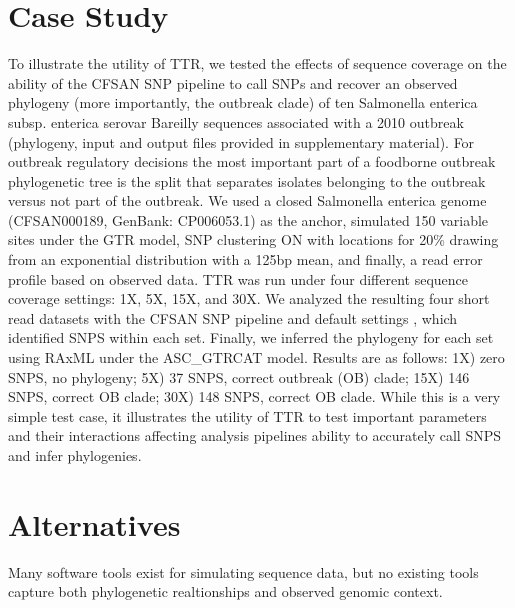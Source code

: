 \section{Case Study}
To illustrate the utility of TTR, we tested the effects of sequence coverage on the ability of the CFSAN SNP pipeline \citep{davis_cfsan_2015} 
to call SNPs and recover an observed phylogeny (more importantly, the outbreak clade) of ten Salmonella enterica subsp. enterica serovar Bareilly sequences 
associated with a 2010 outbreak \citep{hoffmann_tracing_2015} (phylogeny, input and output files provided in supplementary material). 
For outbreak regulatory decisions the most important part of a foodborne outbreak phylogenetic tree is the split that separates isolates belonging to the outbreak versus not part of the outbreak. 
We used a closed Salmonella enterica genome (CFSAN000189, GenBank: CP006053.1) as the anchor, simulated 150 variable sites under the GTR model, 
SNP clustering ON with locations for 20\% drawing from an exponential distribution with a 125bp mean, and finally, a read error profile based on observed data. 
TTR was run under four different sequence coverage settings: 1X, 5X, 15X, and 30X. 
We analyzed the resulting four short read datasets with the CFSAN SNP pipeline and default settings \citep{davis_cfsan_2015}, 
which identified SNPS within each set. 
Finally, we inferred the phylogeny for each set using RAxML \citep{stamatakis_raxml_2014} under the ASC\_GTRCAT model.  
Results are as follows: 1X) zero SNPS, no phylogeny; 5X) 37 SNPS, correct outbreak (OB) clade; 15X) 146 SNPS, correct OB clade; 30X) 148 SNPS, correct OB clade.  
While this is a very simple test case, it illustrates the utility of TTR to test important parameters and their interactions affecting analysis pipelines ability to accurately call SNPS and infer phylogenies.

\section{Alternatives}
Many software tools exist for simulating sequence data,
but no existing tools capture both phylogenetic realtionships and observed genomic context.

